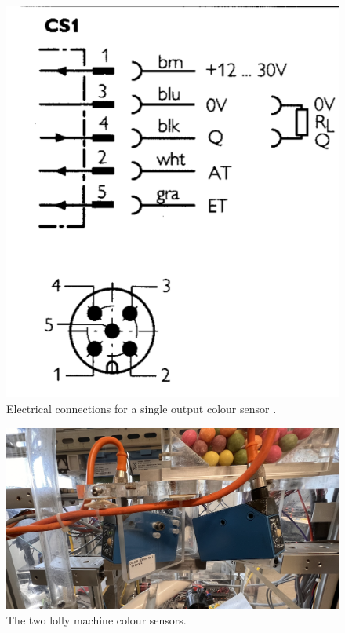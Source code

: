         \begin{figure}[H]
            \centering
            \includegraphics[scale = 0.4]{2_images/cs1.png}
            \caption{Electrical connections for a single output colour sensor \cite{sickCs}.}
            \label{fig:cs1}
        \end{figure}     
        
        \begin{figure}[H]
            \centering
            \includegraphics[scale = 0.4]{2_images/colSens.png}
            \caption{The two lolly machine colour sensors.}
            \label{fig:colSens}
        \end{figure}       


